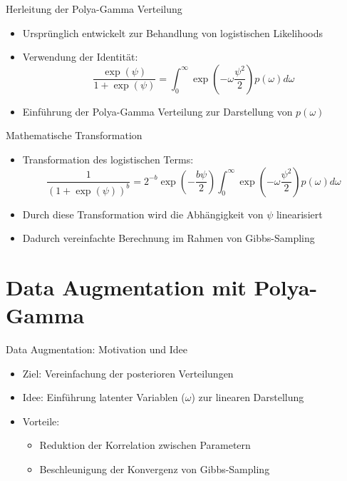 \documentclass{beamer}
\begin{document}
\begin{frame}{Herleitung der Polya-Gamma Verteilung}
  \begin{itemize}
    \item Ursprünglich entwickelt zur Behandlung von logistischen Likelihoods
    \item Verwendung der Identität:
    \[ \frac{\exp(\psi)}{1+\exp(\psi)} = \int_0^\infty \exp\left(-\omega \frac{\psi^2}{2}\right) p(\omega) d\omega \]
    \item Einführung der Polya-Gamma Verteilung zur Darstellung von $p(\omega)$
  \end{itemize}
\end{frame}

\begin{frame}{Mathematische Transformation}
  \begin{itemize}
    \item Transformation des logistischen Terms:
    \[ \frac{1}{(1+\exp(\psi))^b} = 2^{-b} \exp\left( -\frac{b \psi}{2} \right) \int_0^\infty \exp\left( -\omega \frac{\psi^2}{2} \right) p(\omega) d\omega \]
    \item Durch diese Transformation wird die Abhängigkeit von $\psi$ linearisiert
    \item Dadurch vereinfachte Berechnung im Rahmen von Gibbs-Sampling
  \end{itemize}
\end{frame}

\section{Data Augmentation mit Polya-Gamma}
\begin{frame}{Data Augmentation: Motivation und Idee}
  \begin{itemize}
    \item Ziel: Vereinfachung der posterioren Verteilungen
    \item Idee: Einführung latenter Variablen ($\omega$) zur linearen Darstellung
    \item Vorteile:
    \begin{itemize}
      \item Reduktion der Korrelation zwischen Parametern
      \item Beschleunigung der Konvergenz von Gibbs-Sampling
    \end{itemize}
  \end{itemize}
\end{frame}
\end{document}
